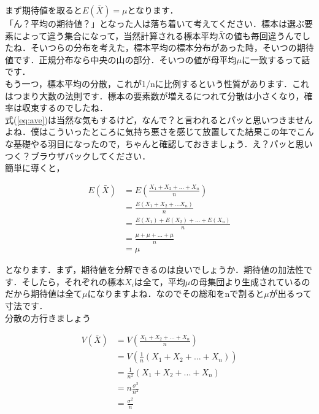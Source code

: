 \documentclass[11pt,a4paper,uplatex]{ujreport} 	%
\begin{document}
まず期待値を取ると$E(\bar{X}) = \mu$となります．\\

「ん？平均の期待値？」となった人は落ち着いて考えてください．標本は選ぶ要素によって違う集合になって，当然計算される標本平均$\bar{X}$の値も毎回違うんでしたね．そいつらの分布を考えた，標本平均の標本分布があった時，そいつの期待値です．正規分布なら中央の山の部分．そいつの値が母平均$\mu$に一致するって話です．\\

もう一つ，標本平均の分散，これが1/nに比例するという性質があります．これはつまり大数の法則です．標本の要素数が増えるにつれて分散は小さくなり，確率は収束するのでしたね．\\

式(\ref{eq:ave})は当然な気もするけど，なんで？と言われるとパッと思いつきませんよね．僕はこういったところに気持ち悪さを感じて放置してた結果この年でこんな基礎やる羽目になったので，ちゃんと確認しておきましょう．え？パッと思いつく？ブラウザバックしてください．\\

簡単に導くと，

\begin{align}
  E(\bar{X}) &= E(\frac{X_1 + X_2 + ...+X_n}{n})\\
             &= \frac{E(X_1+X_2+...X_n)}{n}\\
             &= \frac{E(X_1) + E(X_2)+...+E(X_n)}{n}\\
             &= \frac{\mu+\mu+...+\mu}{n}\\
             &=\mu 
\end{align}

となります．まず，期待値を分解できるのは良いでしょうか．期待値の加法性です．そしたら，それぞれの標本$X_i$は全て，平均$\mu$の母集団より生成されているのだから期待値は全て$\mu$になりますよね．なのでその総和をnで割ると$\mu$が出るって寸法です．\\

分散の方行きましょう

\begin{align}
  V(\bar{X}) &= V(\frac{X_1+X_2+...+X_n}{n})\\
             &= V(\frac{1}{n}(X_1 + X_2 +...+ X_n)) \\
             &= \frac{1}{n^2}(X_1 + X_2+...+X_n)\\
             &= n\frac{\sigma^2}{n^2}\\
             &= \frac{\sigma^2}{n}
             \label{eq:hyohonvar1}
\end{align}
\end{document}
